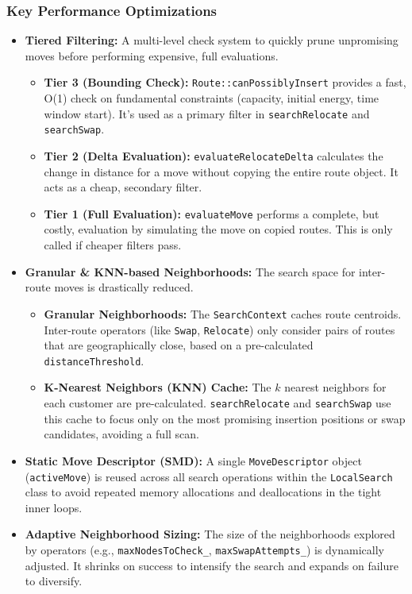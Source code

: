 \documentclass[a4paper,12pt]{article}
\begin{document}
\subsubsection{Key Performance Optimizations}
\begin{itemize}
    \item \textbf{Tiered Filtering:} A multi-level check system to quickly prune unpromising moves before performing expensive, full evaluations.
    \begin{itemize}
        \item \textbf{Tier 3 (Bounding Check):} \texttt{Route::canPossiblyInsert} provides a fast, O(1) check on fundamental constraints (capacity, initial energy, time window start). It's used as a primary filter in \texttt{searchRelocate} and \texttt{searchSwap}.
        \item \textbf{Tier 2 (Delta Evaluation):} \texttt{evaluateRelocateDelta} calculates the change in distance for a move without copying the entire route object. It acts as a cheap, secondary filter.
        \item \textbf{Tier 1 (Full Evaluation):} \texttt{evaluateMove} performs a complete, but costly, evaluation by simulating the move on copied routes. This is only called if cheaper filters pass.
    \end{itemize}
    \item \textbf{Granular & KNN-based Neighborhoods:} The search space for inter-route moves is drastically reduced.
    \begin{itemize}
        \item \textbf{Granular Neighborhoods:} The \texttt{SearchContext} caches route centroids. Inter-route operators (like \texttt{Swap}, \texttt{Relocate}) only consider pairs of routes that are geographically close, based on a pre-calculated \texttt{distanceThreshold}.
        \item \textbf{K-Nearest Neighbors (KNN) Cache:} The $k$ nearest neighbors for each customer are pre-calculated. \texttt{searchRelocate} and \texttt{searchSwap} use this cache to focus only on the most promising insertion positions or swap candidates, avoiding a full scan.
    \end{itemize}
    \item \textbf{Static Move Descriptor (SMD):} A single \texttt{MoveDescriptor} object (\texttt{activeMove}) is reused across all search operations within the \texttt{LocalSearch} class to avoid repeated memory allocations and deallocations in the tight inner loops.
    \item \textbf{Adaptive Neighborhood Sizing:} The size of the neighborhoods explored by operators (e.g., \texttt{maxNodesToCheck_}, \texttt{maxSwapAttempts_}) is dynamically adjusted. It shrinks on success to intensify the search and expands on failure to diversify.
\end{itemize}
\end{document}
